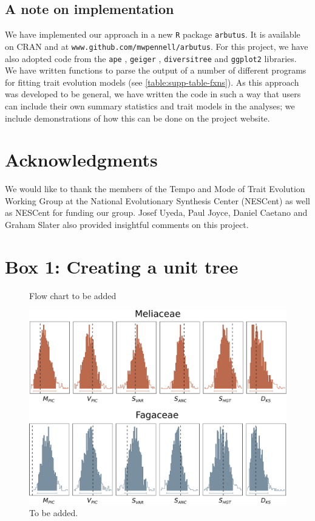 \documentclass[a4paper,12pt]{article}
\begin{document}
\subsection{A note on implementation}

We have implemented our approach in a new \texttt{R} package \texttt{arbutus}. It is available on CRAN and at \texttt{www.github.com/mwpennell/arbutus}. For this project, we have also adopted code from the \texttt{ape} \citep{ape}, \texttt{geiger} \citep{geiger}, \texttt{diversitree} \citep{FitzJohn2012} and \texttt{ggplot2} \citep{ggplot2} libraries. We have written functions to parse the output of a number of different programs for fitting trait evolution models (see \ref{table:supp-table-fxns}). As this approach was developed to be general, we have written the code in such a way that users can include their own summary statistics and trait models in the analyses; we include demonstrations of how this can be done on the project website.

\section{Acknowledgments}
We would like to thank the members of the Tempo and Mode of Trait Evolution Working Group at the National Evolutionary Synthesis Center (NESCent) as well as NESCent for funding our group. Josef Uyeda, Paul Joyce, Daniel Caetano and Graham Slater also provided insightful comments on this project.

\newpage
\section{Box 1: Creating a unit tree}
\vfill

\newpage



\begin{figure}[p]
  \centering
  \caption{Flow chart to be added}
  \label{fig:flowchart}
\end{figure}

\begin{figure}[p]
  \centering
  \includegraphics[scale=0.65]{figs/two-clade-example}
  \caption{To be added.}
  \label{fig:two-clades}
\end{figure}
\end{document}
